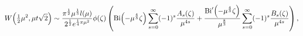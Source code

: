 \[\mathop{W\/}\nolimits\!\left(\tfrac{1}{2}\mu^{2},\mu t\sqrt{2}\right)\sim\frac%
{\pi^{\frac{1}{2}}\mu^{\frac{1}{3}}l(\mu)}{2^{\frac{1}{2}}e^{\frac{1}{4}\pi\mu%
^{2}}}\phi(\zeta)\left(\mathop{\mathrm{Bi}\/}\nolimits\!\left(-\mu^{\frac{4}{3%
}}\zeta\right)\sum_{s=0}^{\infty}(-1)^{s}\frac{A_{s}(\zeta)}{\mu^{4s}}+\frac{%
\mathop{\mathrm{Bi}\/}\nolimits'\!\left(-\mu^{\frac{4}{3}}\zeta\right)}{\mu^{%
\frac{8}{3}}}\sum_{s=0}^{\infty}(-1)^{s}\frac{B_{s}(\zeta)}{\mu^{4s}}\right),\]